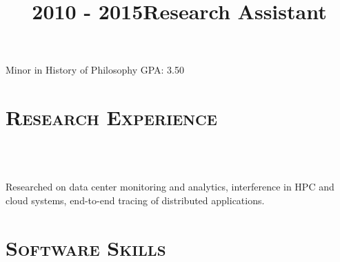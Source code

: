 \begin{resume}
	\title{2010 - 2015}
	\begin{position}
		Minor in History of Philosophy \hfill GPA: 3.50 \hspace{-2.5mm}
	\end{position}



	\section{\textsc{Research Experience}}

	\begin{formatb}
		\\
		\body\\
	\end{formatb}

	\title{Research Assistant}
	\begin{position}
		Researched on data center monitoring and analytics, interference in HPC and
    cloud systems, end-to-end tracing of distributed applications.
	\end{position}


	\section{\textsc{Software Skills}}


\end{resume}

